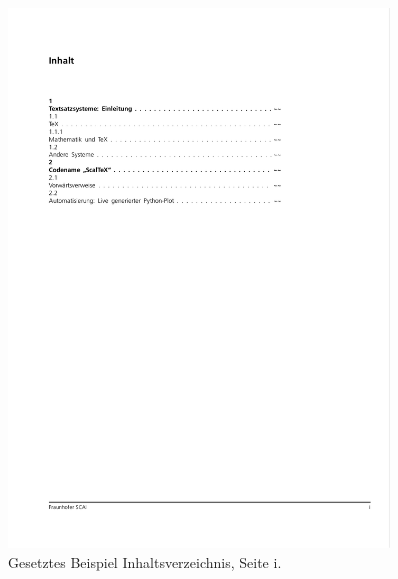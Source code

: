 \begin{figure}[h!]
  \centering
    \includegraphics[width=0.9\textwidth]{figures/dsl_skript_0.pdf}
  \caption{Gesetztes Beispiel Inhaltsverzeichnis, Seite i.}\label{fig-dsl_skript_0}
\end{figure}

